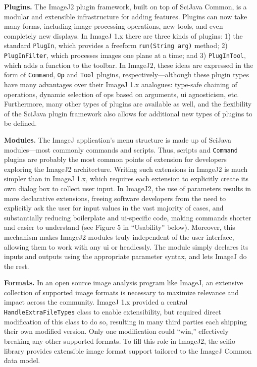 \documentclass{bmcart}
\begin{document}
\textbf{Plugins.} The ImageJ2 plugin framework, built on top of SciJava Common,
is a modular and extensible infrastructure for adding features. Plugins can now
take many forms, including image processing operations, new tools, and even
completely new displays. In ImageJ 1.x there are three kinds of plugins: 1) the
standard \texttt{PlugIn}, which provides a freeform \texttt{run(String arg)}
method; 2) \texttt{PlugInFilter}, which processes images one plane at a time;
and 3) \texttt{PlugInTool}, which adds a function to the toolbar. In ImageJ2,
these ideas are expressed in the form of \texttt{Command}, \texttt{Op} and
\texttt{Tool} plugins, respectively---although these plugin types have many
advantages over their ImageJ 1.x analogues: type-safe chaining of operations,
dynamic selection of ops based on arguments, \acrshort{ui} agnosticism, etc.
Furthermore, many other types of plugins are available as well, and the
flexibility of the SciJava plugin framework also allows for additional new
types of plugins to be defined.

\textbf{Modules.} The ImageJ application's menu structure is made up of SciJava
modules---most commonly commands and scripts. Thus, scripts and
\texttt{Command} plugins are probably the most common points of extension for
developers exploring the ImageJ2 architecture. Writing such extensions in
ImageJ2 is much simpler than in ImageJ 1.x, which requires each extension to
explicitly create its own dialog box to collect user input. In ImageJ2, the use
of parameters results in more declarative extensions, freeing software
developers from the need to explicitly ask the user for input values in the
vast majority of cases, and substantially reducing boilerplate and
\acrshort{ui}-specific code, making commands shorter and easier to understand
(see Figure 5 in ``Usability'' below). Moreover, this mechanism makes ImageJ2
modules truly independent of the user interface, allowing them to work with any
\acrshort{ui} or headlessly. The module simply declares its inputs and outputs
using the appropriate parameter syntax, and lets ImageJ do the rest.

\textbf{Formats.} In an open source image analysis program like ImageJ, an
extensive collection of supported image formats is necessary to maximize
relevance and impact across the community. ImageJ 1.x provided a central
\texttt{HandleExtraFileTypes} class to enable extensibility, but required
direct modification of this class to do so, resulting in many third parties
each shipping their own modified version. Only one modification could ``win,''
effectively breaking any other supported formats. To fill this role in ImageJ2,
the \acrshort{scifio} library provides extensible image format support tailored
to the ImageJ Common data model.
\end{document}
